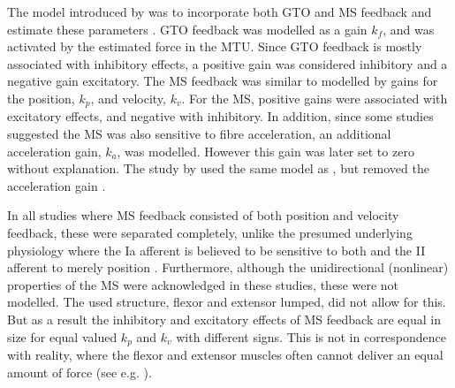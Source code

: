 The model introduced by \citeauthor{schouten_nmclab_2008} was  to incorporate both GTO and MS feedback and estimate these parameters \cite{schouten_nmclab_2008}. GTO feedback was modelled as a gain $k_f$, and was activated by the estimated force in the MTU. Since GTO feedback is mostly associated with inhibitory effects, a positive gain was considered inhibitory and a negative gain excitatory. The MS feedback was similar to \citeauthor{van_der_helm_identification_2002} modelled by gains for the position, $k_p$, and velocity, $k_v$. For the MS, positive gains were associated with excitatory effects, and negative with inhibitory. In addition, since some studies suggested the MS was also sensitive to fibre acceleration, an additional acceleration gain, $k_a$, was modelled. However this gain was later set to zero without explanation. The study by \citeauthor{mugge_rigorous_2010} used the same model as \citeauthor{schouten_nmclab_2008}, but removed the acceleration gain \cite{mugge_rigorous_2010}.

In all studies where MS feedback consisted of both position and velocity feedback, these were separated completely, unlike the presumed underlying physiology where the Ia afferent is believed to be sensitive to both and the II afferent to merely position \cite{van_der_helm_identification_2002, schouten_nmclab_2008, mugge_rigorous_2010}. Furthermore, although the unidirectional (nonlinear) properties of the MS were acknowledged in these studies, these were not modelled. The used structure, flexor and extensor lumped, did not allow for this. But as a result the inhibitory and excitatory effects of MS feedback are equal in size for equal valued $k_p$ and $k_v$ with different signs. This is not in correspondence with reality, where the flexor and extensor muscles often cannot deliver an equal amount of force (see e.g. \cite{winters_analysis_1985}). 


